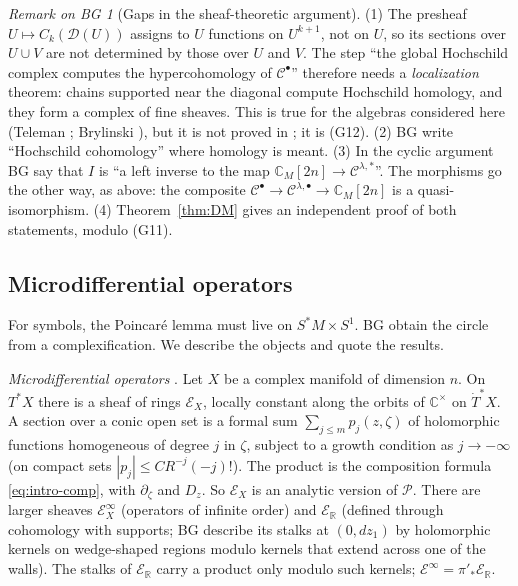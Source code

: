 \documentclass[11pt,oneside,reqno]{article}
\newcommand{\C}{\mathbb C}
\newcommand{\R}{\mathbb R}
\newcommand{\cD}{\mathcal D}
\newcommand{\cE}{\mathcal E}
\newcommand{\cP}{\mathcal P}
\newcommand{\Tdot}{\dot T^*}
\newcommand{\pa}{\partial}
\theoremstyle{plain}
\theoremstyle{definition}
\theoremstyle{remark}
\newtheorem{bgremark}[theorem]{Remark on BG}
\begin{document}
\begin{bgremark}[Gaps in the sheaf-theoretic argument]\label{rem:sheafgap}
(1) The presheaf \(U\mapsto C_k(\cD(U))\) assigns to \(U\) functions on \(U^{k+1}\), not on \(U\), so
its sections over \(U\cup V\) are not determined by those over \(U\) and \(V\). The step
``the global Hochschild complex computes the hypercohomology of \(\mathcal C^\bullet\)'' therefore
needs a \emph{localization} theorem: chains supported near the diagonal compute
Hochschild homology, and they form a complex of fine sheaves. This is true for
the algebras considered here (Teleman \cite{Teleman}; Brylinski
\cite{Brylinski-examples}), but it is not proved in \cite{BG}; it is (G12). (2) BG
write ``Hochschild cohomology'' where homology is meant. (3) In the cyclic
argument BG say that \(I\) is ``a left inverse to the map \(\C_M[2n]\to\mathcal C^{\lambda,*}\)''. The
morphisms go the other way, as above: the composite \(\mathcal C^\bullet\to\mathcal C^{\lambda,\bullet}\to\C_M[2n]\) is a
quasi-isomorphism. (4) Theorem~\ref{thm:DM} gives an independent proof of both
statements, modulo (G11).
\end{bgremark}

\subsection{Microdifferential operators}\label{subsec:micro}
For symbols, the Poincaré lemma must live on \(S^*M\times S^1\). BG obtain the circle from a
complexification. We describe the objects and quote the results.

\emph{Microdifferential operators} \cite{SKK,Kashiwara-book}. Let \(X\) be a complex
manifold of dimension \(n\). On \(T^*X\) there is a sheaf of rings \(\cE_X\), locally constant
along the orbits of \(\C^\times\) on \(\Tdot X\). A section over a conic open set is a formal sum
\(\sum_{j\le m}p_j(z,\zeta)\) of holomorphic functions homogeneous of degree \(j\) in \(\zeta\), subject to
a growth condition as \(j\to-\infty\) (on compact sets \(|p_j|\le C R^{-j}(-j)!\)). The product is
the composition formula \eqref{eq:intro-comp}, with \(\pa_\zeta\) and \(D_z\). So \(\cE_X\) is an analytic
version of \(\cP\). There are larger sheaves \(\cE^\infty_X\) (operators of infinite order) and
\(\cE_{\R}\) (defined through cohomology with supports; BG describe its stalks at
\((0,dz_1)\) by holomorphic kernels on wedge-shaped regions modulo kernels that
extend across one of the walls). The stalks of \(\cE_{\R}\) carry a product only modulo
such kernels; \(\cE^\infty=\pi'_*\cE_{\R}\).
\end{document}
